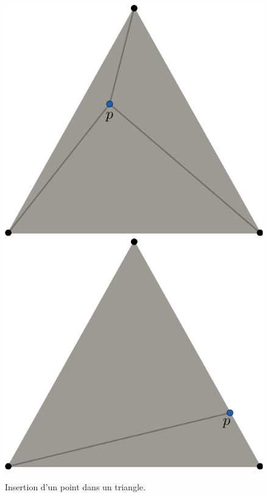 \begin{figure}[h!]
\centering
\includegraphics[scale=0.37]{images/insert_pt_1.pdf}\hfill
\includegraphics[scale=0.37]{images/insert_pt_2.pdf}
\caption{Insertion d'un point dans un triangle.}
\label{fig:insert_pt}
\end{figure}

